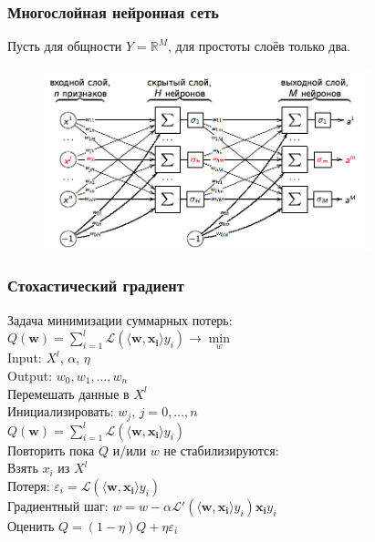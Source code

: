 \documentclass[12pt]{beamer}
\begin{document}
\begin{frame}\frametitle{Многослойная нейронная сеть}
Пусть для общности $Y = \mathbb{R}^M$, для простоты слоёв только два.\\

\begin{figure}[htbp]
  \includegraphics[height=150pt, keepaspectratio = true]{images/neural_network}   
\end{figure}
\end{frame}

\begin{frame}\frametitle{Стохастический градиент}
Задача минимизации суммарных потерь:\\
${Q}(\mathbf{w}) = \sum\limits_{i=1}^l \mathcal{L}(\langle \mathbf{w}, \mathbf{x_i} \rangle y_i) \rightarrow \min\limits_w$ \\
Input: $X^l$, $\alpha$, $\eta$\\
Output: $w_0, w_1, \dots, w_n$\\
\vspace{3mm}
Перемешать данные в $X^l$\\
Инициализировать: $w_j$, $j=0,\dots, n$\\
\hspace{35mm} ${Q}(\mathbf{w}) = \sum\limits_{i=1}^l \mathcal{L}(\langle \mathbf{w}, \mathbf{x_i} \rangle y_i)$\\
Повторить пока $Q$ и/или $w$ не стабилизируются:\\
\hspace{5mm} Взять $x_i$ из $X^l$\\
\hspace{5mm} Потеря: $\varepsilon_i = \mathcal{L}(\langle \mathbf{w}, \mathbf{x_i} \rangle y_i)$\\
\hspace{5mm} Градиентный шаг: $w =  w - \alpha \mathcal{L}'(\langle \mathbf{w}, \mathbf{x_i}\rangle y_i)\mathbf{x_i}y_i$\\
\hspace{5mm} Оценить $Q = (1-\eta)Q + \eta \varepsilon_i$
\end{frame}
\end{document}

